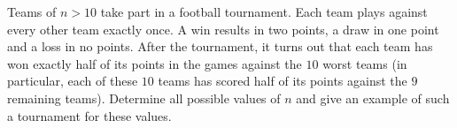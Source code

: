 Teams of $n>10$ take part in a football tournament.
Each team plays against every other team exactly once. A win results in two points,
a draw in one point and a loss in no points. After the tournament,
it turns out that each team has won exactly half of its points in the games against the $10$
worst teams (in particular, each of these $10$ teams has scored half of its points against
the $9$ remaining teams).
Determine all possible values of $n$ and give an example of such a tournament for these values.
